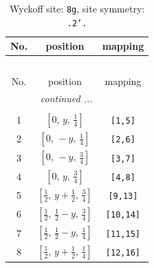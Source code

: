 \documentclass[fleqn,8pt]{jsarticle}
\begin{document}
\begin{longtable}{ccc}
\caption{Wyckoff site: {\tt 8g}, site symmetry: {\tt .2'.}}
 \\
 \hline \hline
No. & position & mapping \\ \hline \endfirsthead

\multicolumn{2}{l}{\tablename\ \thetable{}} \\
 \hline \hline
No. & position & mapping \\ \hline \endhead

 \hline \hline
\multicolumn{2}{r}{\footnotesize\it continued ...} \\ \endfoot

 \hline \hline
\multicolumn{2}{r}{} \\ \endlastfoot

1 & $\left[ 0,\, y,\, \frac{1}{4} \right]$ & {\tt [1,5]} \\ \hline
2 & $\left[ 0,\, - y,\, \frac{1}{4} \right]$ & {\tt [2,6]} \\ \hline
3 & $\left[ 0,\, - y,\, \frac{3}{4} \right]$ & {\tt [3,7]} \\ \hline
4 & $\left[ 0,\, y,\, \frac{3}{4} \right]$ & {\tt [4,8]} \\ \hline
5 & $\left[ \frac{1}{2},\, y + \frac{1}{2},\, \frac{3}{4} \right]$ & {\tt [9,13]} \\ \hline
6 & $\left[ \frac{1}{2},\, \frac{1}{2} - y,\, \frac{3}{4} \right]$ & {\tt [10,14]} \\ \hline
7 & $\left[ \frac{1}{2},\, \frac{1}{2} - y,\, \frac{1}{4} \right]$ & {\tt [11,15]} \\ \hline
8 & $\left[ \frac{1}{2},\, y + \frac{1}{2},\, \frac{1}{4} \right]$ & {\tt [12,16]} \\
\end{longtable}
\renewcommand{\arraystretch}{1.2}
\end{document}
